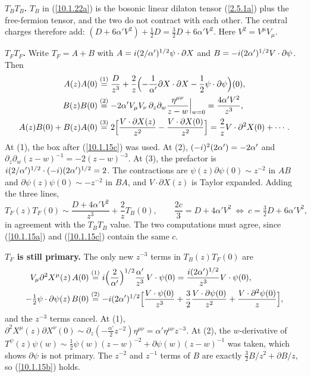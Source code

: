 \begin{tcolorbox}[breakable]
	\begin{remark}
		\textbf{$T_BT_B$.} $T_B$ in (\ref{10.1.22a}) is the bosonic linear dilaton tensor (\ref{2.5.1a}) plus the free-fermion tensor, and the two do not contract with each other. The central charges therefore add: $(D+6\alpha'V^{2})+\tfrac12D=\tfrac32D+6\alpha'V^2$. Here $V^2=V^\mu V_\mu$.

		\textbf{$T_FT_F$.} Write $T_F=A+B$ with $A=i(2/\alpha')^{1/2}\psi\cdot\partial X$ and $B=-i(2\alpha')^{1/2}V\cdot\partial\psi$. Then
		\begin{align*}
			A(z)A(0)&\overset{(1)}{=}\frac{D}{z^{3}}+\frac{2}{z}\Bigl(-\frac{1}{\alpha'}\partial X\cdot\partial X-\frac12\psi\cdot\partial\psi\Bigr)(0),\\
			B(z)B(0)&\overset{(2)}{=}-2\alpha'V_\mu V_\nu\,\partial_z\partial_w\frac{\eta^{\mu\nu}}{z-w}\Big|_{w=0}=\frac{4\alpha'V^{2}}{z^{3}},\\
			A(z)B(0)+B(z)A(0)&\overset{(3)}{=}2\Bigl[\frac{V\cdot\partial X(z)}{z^{2}}-\frac{V\cdot\partial X(0)}{z^{2}}\Bigr]=\frac{2}{z}V\cdot\partial^{2}X(0)+\cdots .
		\end{align*}
		At (1), the box after (\ref{10.1.15c}) was used. At (2), $(-i)^{2}(2\alpha')=-2\alpha'$ and $\partial_z\partial_w(z-w)^{-1}=-2(z-w)^{-3}$. At (3), the prefactor is $i(2/\alpha')^{1/2}\cdot(-i)(2\alpha')^{1/2}=2$. The contractions are $\psi(z)\partial\psi(0)\sim z^{-2}$ in $AB$ and $\partial\psi(z)\psi(0)\sim-z^{-2}$ in $BA$, and $V\cdot\partial X(z)$ is Taylor expanded. Adding the three lines,
		\begin{equation*}
			T_F(z)T_F(0)\sim\frac{D+4\alpha'V^{2}}{z^{3}}+\frac{2}{z}T_B(0),\qquad \frac{2c}{3}=D+4\alpha'V^{2}\ \Longleftrightarrow\ \boxed{c=\tfrac32D+6\alpha'V^{2}} ,
		\end{equation*}
		in agreement with the $T_BT_B$ value. The two computations must agree, since (\ref{10.1.15a}) and (\ref{10.1.15c}) contain the same $c$.

		\textbf{$T_F$ is still primary.} The only new $z^{-3}$ terms in $T_B(z)T_F(0)$ are
		\begin{align*}
			V_\mu\partial^{2}X^{\mu}(z)\,A(0)&\overset{(1)}{=}i\Bigl(\frac{2}{\alpha'}\Bigr)^{1/2}\frac{\alpha'}{z^{3}}\,V\cdot\psi(0)=\frac{i(2\alpha')^{1/2}}{z^{3}}V\cdot\psi(0),\\
			-\tfrac12\psi\cdot\partial\psi(z)\,B(0)&\overset{(2)}{=}-i(2\alpha')^{1/2}\Bigl[\frac{V\cdot\psi(0)}{z^{3}}+\frac{3}{2}\frac{V\cdot\partial\psi(0)}{z^{2}}+\frac{V\cdot\partial^{2}\psi(0)}{z}\Bigr],
		\end{align*}
		and the $z^{-3}$ terms cancel. At (1), $\partial^{2}X^\mu(z)\partial X^\nu(0)\sim\partial_z(-\tfrac{\alpha'}{2}z^{-2})\eta^{\mu\nu}=\alpha'\eta^{\mu\nu}z^{-3}$. At (2), the $w$-derivative of $T^\psi(z)\psi(w)\sim\tfrac12\psi(w)(z-w)^{-2}+\partial\psi(w)(z-w)^{-1}$ was taken, which shows $\partial\psi$ is not primary. The $z^{-2}$ and $z^{-1}$ terms of $B$ are exactly $\tfrac32B/z^{2}+\partial B/z$, so (\ref{10.1.15b}) holds.
	\end{remark}
\end{tcolorbox}

